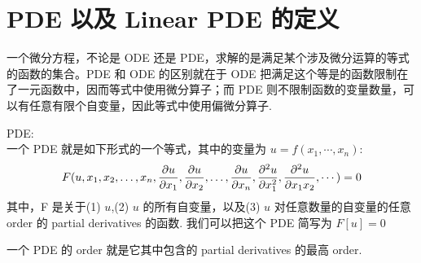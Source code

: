 \documentclass[12pt]{article}
\begin{document}
\section{PDE 以及 Linear PDE 的定义}
一个微分方程，不论是 ODE 还是 PDE，求解的是满足某个涉及微分运算的等式的函数的集合。PDE 和 ODE 的区别就在于 ODE 把满足这个等是的函数限制在了一元函数中，因而等式中使用微分算子；而 PDE 则不限制函数的变量数量，可以有任意有限个自变量，因此等式中使用偏微分算子.
\begin{defn}
    PDE:
    \\
    一个 PDE 就是如下形式的一个等式，其中的变量为 $u = f(x_1,  \cdots, x_n)$:
    $$
    \\F(u, x_1, x_2, \ldots, x_n, \frac{\partial u}{\partial x_1}, \frac{\partial u}{\partial x_2}, \ldots, \frac{\partial u}{\partial x_n}, \frac{\partial^2 u}{\partial x_1 ^ 2}, \frac{\partial^2 u}{\partial x_1 x_2 }, \cdots) = 0
    $$
    其中，F 是关于(1) $u$,(2) $u$ 的所有自变量，以及(3) $u$ 对任意数量的自变量的任意 order 的 partial derivatives 的函数.
    我们可以把这个 PDE 简写为 $F[u] = 0$
\end{defn}

\begin{defn}
    一个 PDE 的 order 就是它其中包含的 partial derivatives 的最高 order.
\end{defn}
\end{document}
